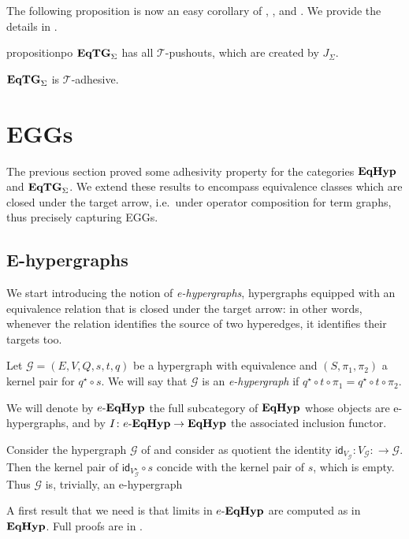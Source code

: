\documentclass[a4paper,UKenglish,cleveref,pdftex,thm-restate,numberwithinsect]{lipics-v2021}
\newcommand{\catname}[1]{\textbf{\textup{#1}}}
\newcommand{\EqHyp}{\catname{EqHyp}} %
\newcommand{\EqTG}{\catname{EqTG}}
\newcommand{\egg}{\mathsf{e}\text{-}\catname{EqHyp}}
\newcommand{\id}[1]{\mathsf{id}_{#1}}
\begin{document}
The following proposition is now an easy corollary of , , and . We provide the details in .


\begin{restatable}{proposition}{po}\label{prop:po}
$\EqTG_{\Sigma}$ has all $\mathcal{T}$-pushouts, which are created by $J_{\Sigma}$.
\end{restatable}

\begin{corollary}\label{cor:tade}
	$\EqTG_{\Sigma}$ is $\mathcal{T}$-adhesive.
\end{corollary}

\section{EGGs}
\label{eggs}
The previous section proved some adhesivity property for the categories $\EqHyp$ and $\EqTG_{\Sigma}$. We extend these results to
encompass equivalence classes which are closed under the target arrow, i.e.~under operator composition for term graphs, thus precisely capturing EGGs.
%

\subsection{E-hypergraphs}

We start introducing the notion of \emph{e-hypergraphs}, hypergraphs equipped with an equivalence relation that is closed under the target arrow:
in other words, whenever the relation identifies the source of two hyperedges, it identifies their targets too.

\begin{definition}
	Let $\mathcal{G} = (E, V, Q, s, t, q)$ be a hypergraph with equivalence and $(S, \pi_1, \pi_2)$ a kernel pair for $q^\star \circ s$.
	We will say that $\mathcal{G}$ is an \emph{e-hypergraph} if $q^\star \circ t \circ \pi_1 = q^\star \circ t \circ \pi_2$.
	
	We will denote by $\egg$ the full subcategory of $\EqHyp$ whose objects are e-hypergraphs, and by $I\colon \egg \to \EqHyp$ the associated inclusion functor.
\end{definition}


\begin{example}
	Consider the hypergraph $\mathcal{G}$ of  and consider as quotient the identity $\id{V_\mathcal{G}}\colon V_\mathcal{G}\colon \to\mathcal{G}$. Then the kernel pair of $\id{V^\star_\mathcal{G}} \circ s$ concide with the kernel pair of $s$, which is empty. Thus  $\mathcal{G}$ is, trivially, an e-hypergraph
\end{example}
A first result that we need is that limits in $\egg$ are computed as in $\EqHyp$. Full proofs are in .
\end{document}
